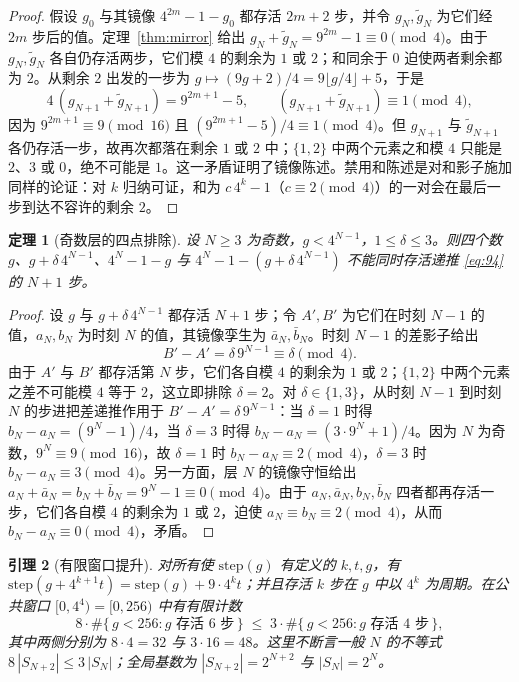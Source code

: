 \documentclass[11pt,a4paper]{article}
\newtheorem{theorem}{定理}[section]
\newtheorem{lemma}[theorem]{引理}
\theoremstyle{remark}
\begin{document}
\begin{proof}
假设 $g_{0}$ 与其镜像 $4^{2m} - 1 - g_{0}$ 都存活 $2m+2$ 步，并令 $g_{N}, \tilde g_{N}$ 为它们经 $2m$ 步后的值。定理~\ref{thm:mirror} 给出 $g_{N} + \tilde g_{N} = 9^{2m} - 1 \equiv 0 \pmod 4$。由于 $g_{N}, \tilde g_{N}$ 各自仍存活两步，它们模 $4$ 的剩余为 $1$ 或 $2$；和同余于 $0$ 迫使两者剩余都为 $2$。从剩余 $2$ 出发的一步为 $g \mapsto (9g+2)/4 = 9\lfloor g/4\rfloor + 5$，于是
\[
  4\,(g_{N+1} + \tilde g_{N+1}) = 9^{2m+1} - 5, \qquad
  (g_{N+1} + \tilde g_{N+1}) \equiv 1 \pmod 4,
\]
因为 $9^{2m+1} \equiv 9 \pmod{16}$ 且 $(9^{2m+1} - 5)/4 \equiv 1 \pmod 4$。但 $g_{N+1}$ 与 $\tilde g_{N+1}$ 各仍存活一步，故再次都落在剩余 $1$ 或 $2$ 中；$\{1,2\}$ 中两个元素之和模 $4$ 只能是 $2$、$3$ 或 $0$，绝不可能是 $1$。这一矛盾证明了镜像陈述。禁用和陈述是对和影子施加同样的论证：对 $k$ 归纳可证，和为 $c\,4^{k} - 1$（$c \equiv 2 \pmod 4$）的一对会在最后一步到达不容许的剩余 $2$。
\end{proof}

\begin{theorem}[奇数层的四点排除]
\label{thm:klein}
设 $N \ge 3$ 为奇数，$g < 4^{N-1}$，$1 \le \delta \le 3$。则四个数 $g$、$g + \delta\,4^{N-1}$、$4^{N} - 1 - g$ 与 $4^{N} - 1 - (g + \delta\,4^{N-1})$ 不能同时存活递推 \eqref{eq:94} 的 $N+1$ 步。
\end{theorem}

\begin{proof}
设 $g$ 与 $g + \delta\,4^{N-1}$ 都存活 $N+1$ 步；令 $A', B'$ 为它们在时刻 $N-1$ 的值，$a_{N}, b_{N}$ 为时刻 $N$ 的值，其镜像孪生为 $\bar a_{N}, \bar b_{N}$。时刻 $N-1$ 的差影子给出
\[
  B' - A' = \delta\, 9^{N-1} \equiv \delta \pmod 4.
\]
由于 $A'$ 与 $B'$ 都存活第 $N$ 步，它们各自模 $4$ 的剩余为 $1$ 或 $2$；$\{1,2\}$ 中两个元素之差不可能模 $4$ 等于 $2$，这立即排除 $\delta = 2$。对 $\delta \in \{1,3\}$，从时刻 $N-1$ 到时刻 $N$ 的步进把差递推作用于 $B' - A' = \delta\, 9^{N-1}$：当 $\delta = 1$ 时得 $b_{N} - a_{N} = (9^{N} - 1)/4$，当 $\delta = 3$ 时得 $b_{N} - a_{N} = (3 \cdot 9^{N} + 1)/4$。因为 $N$ 为奇数，$9^{N} \equiv 9 \pmod{16}$，故 $\delta = 1$ 时 $b_{N} - a_{N} \equiv 2 \pmod 4$，$\delta = 3$ 时 $b_{N} - a_{N} \equiv 3 \pmod 4$。另一方面，层 $N$ 的镜像守恒给出 $a_{N} + \bar a_{N} = b_{N} + \bar b_{N} = 9^{N} - 1 \equiv 0 \pmod 4$。由于 $a_{N}, \bar a_{N}, b_{N}, \bar b_{N}$ 四者都再存活一步，它们各自模 $4$ 的剩余为 $1$ 或 $2$，迫使 $a_{N} \equiv b_{N} \equiv 2 \pmod 4$，从而 $b_{N} - a_{N} \equiv 0 \pmod 4$，矛盾。
\end{proof}

\begin{lemma}[有限窗口提升]
\label{lem:lift}
对所有使 $\mathrm{step}(g)$ 有定义的 $k, t, g$，有 $\mathrm{step}(g + 4^{k+1} t) = \mathrm{step}(g) + 9 \cdot 4^{k} t$；并且存活 $k$ 步在 $g$ 中以 $4^{k}$ 为周期。在公共窗口 $[0, 4^{4}) = [0,256)$ 中有有限计数
\[
  8 \cdot \#\{\, g < 256 : g \text{ 存活 } 6 \text{ 步} \,\}
  \;\le\;
  3 \cdot \#\{\, g < 256 : g \text{ 存活 } 4 \text{ 步} \,\},
\]
其中两侧分别为 $8 \cdot 4 = 32$ 与 $3 \cdot 16 = 48$。这里不断言一般 $N$ 的不等式 $8\,|S_{N+2}| \le 3\,|S_{N}|$；全局基数为 $|S_{N+2}| = 2^{N+2}$ 与 $|S_{N}| = 2^{N}$。
\end{lemma}
\end{document}
